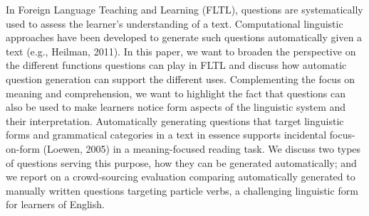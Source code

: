 In Foreign Language Teaching and Learning (FLTL), questions are systematically used to assess the learner's understanding of a text. Computational linguistic approaches have been developed to generate such questions automatically given a text (e.g., Heilman, 2011). In this paper, we want to broaden the perspective on the different functions questions can play in FLTL and discuss how automatic question generation can support the different uses. Complementing the focus on meaning and comprehension, we want to highlight the fact that questions can also be used to make learners notice form aspects of the linguistic system and their interpretation. Automatically generating questions that target linguistic forms and grammatical categories in a text in essence supports incidental focus-on-form (Loewen, 2005) in a meaning-focused reading task. We discuss two types of questions serving this purpose, how they can be generated automatically; and we report on a crowd-sourcing evaluation comparing automatically generated to manually written questions targeting particle verbs, a challenging linguistic form for learners of English.
